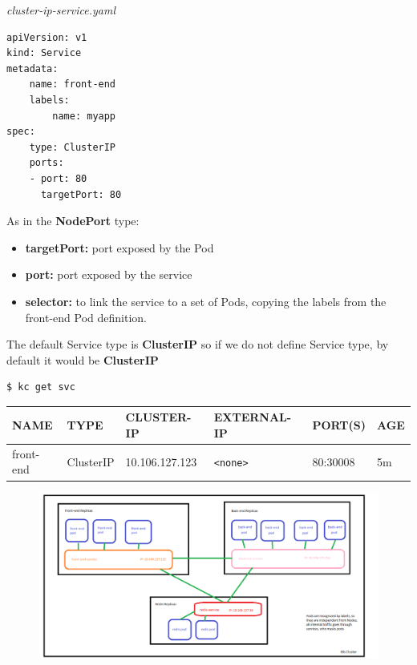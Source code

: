 \documentclass{article}
\newenvironment{blocktemplateI}[1]{%
    \tcolorbox[beamer,%
    noparskip,breakable,
    colframe=Violet,%
    colbacklower=Black,%
    title=#1]}%
    {\endtcolorbox}
\newenvironment{codetemplate}[1][]{%
  \mybasecolorbox[#1]
  \itshape
}{%
  \endmybasecolorbox
}
\begin{document}
\begin{codetemplate}{cluster-ip-service.yaml}
\begin{verbatim}
apiVersion: v1
kind: Service
metadata:
    name: front-end
    labels:
        name: myapp
spec:
    type: ClusterIP
    ports:
    - port: 80
      targetPort: 80
\end{verbatim}
\end{codetemplate}

As in the \textbf{NodePort} type:
\begin{itemize}
    \item \textbf{targetPort:} port exposed by the Pod
    \item \textbf{port:} port exposed by the service
    \item \textbf{selector:} to link the service to a set of Pods, copying the labels from the front-end Pod definition.
\end{itemize}

\begin{blocktemplateI}{NOTE}
The default Service type is \textbf{ClusterIP} so if we do not define Service type, by default it would be \textbf{ClusterIP}
\end{blocktemplateI}

\begin{codetemplate}{}
\begin{verbatim}
$ kc get svc
\end{verbatim}
\end{codetemplate}

\begin{table}[H]
\begin{tabular}{| m{3cm} | m{2cm} | m{2.5cm} | m{2.7cm} | m{2cm} | m{1.2cm} |}
\hline
\textbf{NAME} & \textbf{TYPE} & \textbf{CLUSTER-IP} & \textbf{EXTERNAL-IP} & \textbf{PORT(S)} & \textbf{AGE} \\ \hline
front-end & ClusterIP & 10.106.127.123 & \verb|<none>| & 80:30008 & 5m \\ \hline
\end{tabular}
\end{table}

\begin{figure}[H]
    \centering
    \includegraphics[width=\textwidth]{pictures/services4.png}
\end{figure}
\end{document}
